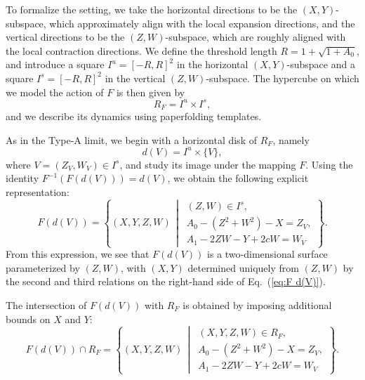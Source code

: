 \documentclass[12pt]{iopart}
\begin{document}
To formalize the setting, we take the horizontal directions to be the \((X,Y)\)-subspace, which approximately align with the local expansion directions, and the vertical directions to be the \((Z,W)\)-subspace, which are roughly aligned with the local contraction directions. We define the threshold length \( R = 1 + \sqrt{1 + A_0} \), and introduce a square \( I^u = [-R,R]^2 \) in the horizontal \((X,Y)\)-subspace and a square \( I^s = [-R,R]^2 \) in the vertical \((Z,W)\)-subspace. The hypercube on which we model the action of \( F \) is then given by
\[
R_F = I^u \times I^s,
\]
and we describe its dynamics using paperfolding templates.

As in the Type‑A limit, we begin with a horizontal disk of \( R_F \), namely
\[
d(V) = I^u \times \{ V \},
\]
where \( V = (Z_V,W_V) \in I^s \), and study its image under the mapping \( F \).  
Using the identity \( F^{-1}(F(d(V))) = d(V) \), we obtain the following explicit representation:
\begin{equation}\label{eq:F d(V)}
F(d(V)) =
\left\lbrace (X,Y,Z,W) \,\middle|\, 
\begin{array}{l}
(Z,W) \in I^s,\\[4pt]
A_0 - (Z^2+W^2) - X = Z_V,\\[4pt]
A_1 - 2ZW - Y + 2cW = W_V
\end{array} \right\rbrace.
\end{equation}
From this expression, we see that \( F(d(V)) \) is a two‑dimensional surface parameterized by \((Z,W)\), with \((X,Y)\) determined uniquely from \((Z,W)\) by the second and third relations on the right-hand side of Eq.~(\ref{eq:F d(V)}).

The intersection of \( F(d(V)) \) with \( R_F \) is obtained by imposing additional bounds on \( X \) and \( Y \):
\begin{equation}\label{eq:F d(V) intersect R_F}
F(d(V))\cap R_F =
\left\lbrace (X,Y,Z,W) \,\middle|\, 
\begin{array}{l}
(X,Y,Z,W) \in R_F,\\[4pt]
A_0 - (Z^2 + W^2) - X = Z_V,\\[4pt]
A_1 - 2ZW - Y + 2cW = W_V
\end{array} \right\rbrace.
\end{equation}
\end{document}

